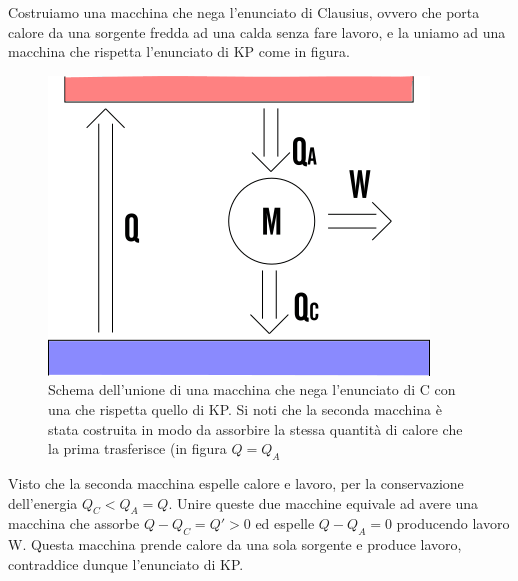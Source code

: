 \documentclass[10pt,a4paper]{article}
\begin{document}
\begin{enumerate}
Costruiamo una macchina che nega l'enunciato di Clausius, ovvero che porta calore da una sorgente fredda ad una calda senza fare lavoro, e la uniamo ad una macchina che rispetta l'enunciato di KP come in figura.
\begin{figure}[h!]
	\centering
	\includegraphics[width=0.5\linewidth]{../images/C-KP}
	\caption{Schema dell'unione di una macchina che nega l'enunciato di C con una che rispetta quello di KP. Si noti che la seconda macchina è stata costruita in modo da assorbire la stessa quantità di calore che la prima trasferisce (in figura \(Q = Q_A\) }
	\label{fig:c-kp}
\end{figure}
\FloatBarrier
Visto che la seconda macchina espelle calore e lavoro, per la conservazione dell'energia \(Q_C<Q_A=Q\).
Unire queste due macchine equivale ad avere una macchina che assorbe \(Q-Q_C = Q' > 0 \) ed espelle \(Q-Q_A = 0\) producendo lavoro W. Questa macchina prende calore da una sola sorgente e produce lavoro, contraddice dunque l'enunciato di KP.  
\end{enumerate} 
\end{document}
